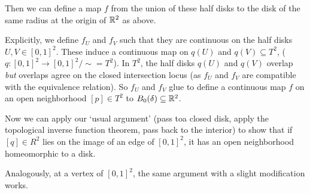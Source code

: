 \documentclass[a4paper]{scrartcl}
\begin{document}
\begin{example}
\begin{center}
        

    \end{center}

Then we can define a map $f$ from the union of these half disks to the disk of the same radius at the origin of $\R^2$ as above. 

Explicitly, we define $f_U$ and $f_V$ such that they are continuous on the half disks $U, V \in [0, 1]^2$. These induce a continuous map on $q(U)$ and $q(V) \subseteq T^2$, ($q: [0, 1]^2 \rightarrow [0, 1]^2/\sim = T^2$). In $T^2$, the half disks $q(U)$ and $q(V)$ overlap \emph{but} overlaps agree on the closed intersection locus (as $f_U$ and $f_V$ are compatible with the equivalence relation). So $f_U$ and $f_V$ glue to define a continuous map $f$ on an open neighborhood $[p] \in T^2$ to $B_0(\delta) \subseteq \R^2$.

Now we can apply our `usual argument' (pass toa closed disk, apply the topological inverse function theorem, pass back to the interior) to show that if $[q] \in R^2$ lies on the image of an edge of $[0, 1]^2$, it has an open neighborhood homeomorphic to a disk.

Analogously, at a vertex of $[0, 1]^2$, the same argument with a slight modification works.
\begin{center}
    


\begin{tikzpicture}[x=0.75pt,y=0.75pt,yscale=-1,xscale=1]


\end{tikzpicture}
\end{center}
\end{example}
\end{document}
